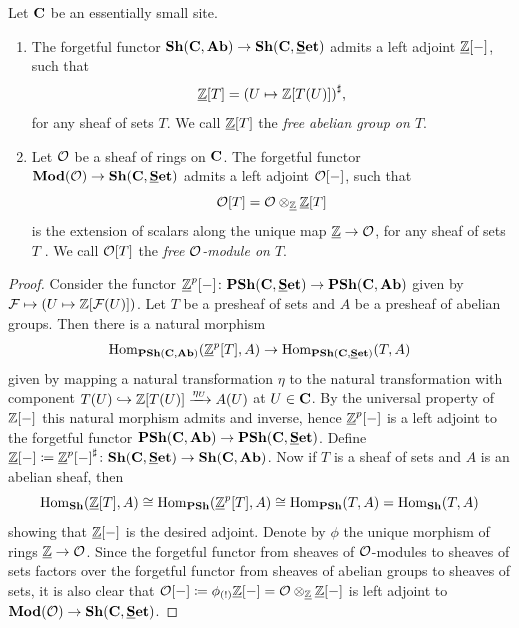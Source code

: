 \begin{lemma}
	\label{lemma: free sheaves}
	
	Let ${{\mathbf{C}}}$ be an essentially small site. 
	\begin{enumerate}
		\item
		The forgetful functor $\Sheaves{\site C}{\Ab} \to \Sheaves{\site C}{\Set}$ admits a left adjoint ${{\underline{{\mathbb{Z}}}}[-]}$, such that
			$$\free {\constantSheaf{\Z}} T = \sheafification{U \mapsto \free \Z {T(U)}},$$
		for any sheaf of sets $T$. We call ${{\underline{{\mathbb{Z}}}}[T]}$ the \emph{free abelian group on $T$}.
		
		\item
		Let ${\mathcal{O}}$ be a sheaf of rings on ${{\mathbf{C}}}$. The forgetful functor $\mod\structsymbol \to \Sheaves{\site C}{\Set}$ admits a left adjoint ${{\mathcal{O}}[-]}$, such that
			$${{\mathcal{O}}[T]} = {\mathcal{O}} \otimes_{{\underline{{\mathbb{Z}}}}} {{\underline{{\mathbb{Z}}}}[T]}$$
		is the extension of scalars along the unique map ${\underline{{\mathbb{Z}}}} \to {\mathcal{O}}$, for any sheaf of sets $T$ . We call ${{\mathcal{O}}[T]}$ the \emph{free ${\mathcal{O}}$-module on $T$}.
	\end{enumerate}
\end{lemma}
\begin{proof}
	Consider the functor $\free{\associated{\Z}^p}{-}\colon\Presheaves{\site{C}}{\Set} \to \Presheaves{\site{C}}{\Ab}$ given by $\sheaf{F}\mapsto \mleft(U\mapsto \free{\Z}{\sheaf{F}(U)}\mright)$. Let $T$ be a presheaf of sets and $A$ be a presheaf of abelian groups. Then there is a natural morphism
		$$\Hom_\Presheaves{\site{C}}{\Ab}(\free{\associated{\Z}^p}{T}, A) \to \Hom_\Presheaves{\site{C}}{\Set}(T, A)$$
	given by mapping a natural transformation $\eta$ to the natural transformation with component $T(U)\hookrightarrow{{\mathbb{Z}}[T(U)]} \xrightarrow{\eta_U} A(U)$ at $U\in{{\mathbf{C}}}$. By the universal property of ${{\mathbb{Z}}[-]}$ this natural morphism admits and inverse, hence ${\underline{{\mathbb{Z}}}^p[-]}$ is a left adjoint to the forgetful functor $\Presheaves{\site{C}}{\Ab} \to \Presheaves{\site{C}}{\Set}$. Define $\free{\associated{\Z}}{-}\ldef \free{\associated{\Z}^p}{-}^\sheafificationsymbol\colon \Sheaves{\site{C}}{\Set}\to\Sheaves{\site{C}}{\Ab}$. Now if $T$ is a sheaf of sets and $A$ is an abelian sheaf, then
		$${\operatorname{Hom}}_{{\mathbf{Sh}}}({\underline{{\mathbb{Z}}}[T]}, A) \cong {\operatorname{Hom}}_{{\mathbf{PSh}}}({\underline{{\mathbb{Z}}}^p[T]}, A) \cong {\operatorname{Hom}}_{{\mathbf{PSh}}}(T, A)={\operatorname{Hom}}_{{\mathbf{Sh}}}(T, A)$$
	showing that ${\underline{{\mathbb{Z}}}[-]}$ is the desired adjoint. Denote by $\phi$ the unique morphism of rings $\underline{{\mathbb{Z}}}\to {\mathcal{O}}$. Since the forgetful functor from sheaves of ${\mathcal{O}}$-modules to sheaves of sets factors over the forgetful functor from sheaves of abelian groups to sheaves of sets, it is also clear that ${{\mathcal{O}}[-]} \coloneqq {\phi_{(!)}}{\underline{{\mathbb{Z}}}[-]} = {\mathcal{O}}\otimes_{\underline{{\mathbb{Z}}}}{\underline{{\mathbb{Z}}}[-]}$ is left adjoint to $\mod{\structsymbol}\to\Sheaves{\site{C}}{\Set}$.
\end{proof}


